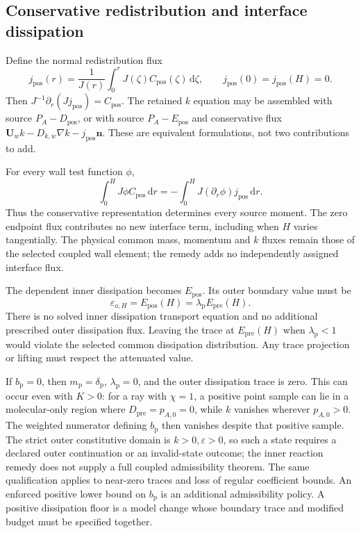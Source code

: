 \documentclass[11pt,a4paper]{article}
\numberwithin{equation}{section}
\newcommand{\eps}{\varepsilon}
\newcommand{\dd}{\mathrm d}
\begin{document}
\subsection{Conservative redistribution and interface dissipation}
\label{st:positive-interface}

Define the normal redistribution flux
\begin{equation}
 j_{\mathrm{pos}}(r)=\frac1{J(r)}
          \int_0^rJ(\zeta)C_{\mathrm{pos}}(\zeta)\,\dd\zeta,
 \qquad
 j_{\mathrm{pos}}(0)=j_{\mathrm{pos}}(H)=0.
 \label{st:positive-flux}
\end{equation}
Then $J^{-1}\partial_r(Jj_{\mathrm{pos}})=C_{\mathrm{pos}}$.
The retained $k$ equation may be assembled with source
$P_A-D_{\mathrm{pos}}$, or with source $P_A-E_{\mathrm{pos}}$
and conservative flux
$\boldsymbol U_wk-D_{k,w}\nabla k-j_{\mathrm{pos}}\boldsymbol n$.
These are equivalent formulations, not two contributions to add.

For every wall test function $\phi$,
\begin{equation}
 \int_0^H J\phi C_{\mathrm{pos}}\,\dd r
 =-\int_0^H J(\partial_r\phi)j_{\mathrm{pos}}\,\dd r .
 \label{st:positive-moments}
\end{equation}
Thus the conservative representation determines every source
moment. The zero endpoint flux contributes no new interface term,
including when $H$ varies tangentially. The physical common mass,
momentum and $k$ fluxes remain those of the selected coupled wall
element; the remedy adds no independently assigned interface flux.

The dependent inner dissipation becomes $E_{\mathrm{pos}}$.
Its outer boundary value must be
\begin{equation}
 \boxed{\eps_{o,H}=E_{\mathrm{pos}}(H)
                 =\lambda_{\mathrm p}E_{\mathrm{pre}}(H).}
 \label{st:positive-epsilon-trace}
\end{equation}
There is no solved inner dissipation transport equation and no
additional prescribed outer dissipation flux. Leaving the trace
at $E_{\mathrm{pre}}(H)$ when $\lambda_{\mathrm p}<1$ would violate
the selected common dissipation distribution.
Any trace projection or lifting must respect the attenuated value.

If $b_{\mathrm p}=0$, then $m_{\mathrm p}=\delta_{\mathrm p}$,
$\lambda_{\mathrm p}=0$, and the outer dissipation trace is zero.
This can occur even with $K>0$: for a ray with $\chi=1$, a positive
point sample can lie in a molecular-only region where
$D_{\mathrm{pre}}=p_{A,0}=0$, while $k$ vanishes wherever
$p_{A,0}>0$. The weighted numerator defining $b_{\mathrm p}$ then
vanishes despite that positive sample.
The strict outer constitutive domain is $k>0,\eps>0$, so such a
state requires a declared outer continuation or an invalid-state
outcome; the inner reaction remedy does not supply a full coupled
admissibility theorem. The same qualification applies to near-zero
traces and loss of regular coefficient bounds. An enforced positive
lower bound on $b_{\mathrm p}$ is an additional admissibility policy.
A positive dissipation floor is a model change whose boundary trace
and modified budget must be specified together.
\end{document}
